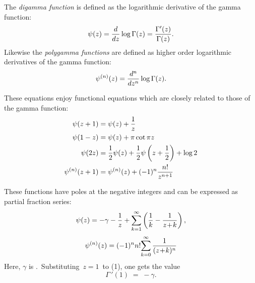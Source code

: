 \documentclass[12pt]{article}
\begin{document}
The \emph{digamma function} is defined as the logarithmic derivative of the gamma function:
 \[ \psi (z) = {d \over dz} \log \Gamma (z) = {\Gamma' (z) \over \Gamma (z)}. \]
Likewise the \emph{polygamma functions} are defined as higher order logarithmic derivatives of the gamma function:
 \[ \psi^{(n)} (z) = {d^n \over dz^n} \log \Gamma (z). \]

These equations enjoy functional equations which are closely related to those of the gamma function:
\begin{align*}
\psi (z+1) &= \psi (z) + {1 \over z} \\
\psi (1-z) &= \psi (z) + \pi \cot \pi z \\
\psi (2z)  &= {1 \over 2} \psi (z) + {1 \over 2} \psi \left( z + {1 \over 2} 
\right) + \log 2 \\
\psi^{(n)} (z+1) &= \psi^{(n)} (z) + (-1)^n {n! \over z^{n+1}} \\
\end{align*}

These functions have poles at the negative integers and can be expressed as partial fraction series:
\begin{align}
\psi(z) = -\gamma-{1\over z}+\sum_{k=1}^\infty \left({1\over k}-{1\over z\!+\!k}\right), 
\end{align}
\begin{align}
\psi^{(n)}(z) = (-1)^nn!\!\sum_{k=0}^\infty{1\over(z\!+\!k)^n}
\end{align}
Here, $\gamma$ is .\, Substituting\, $z = 1$\, to (1), one gets the value
$$\Gamma\,'(1) \;=\; -\gamma.$$
\end{document}
